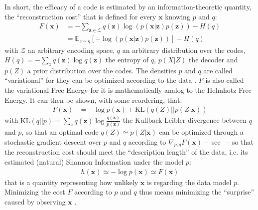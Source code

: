 \documentclass[12pt,twoside,openright]{article}
\begin{document}
In short, the efficacy of a code is estimated by an information-theoretic quantity, the ``reconstruction cost'' that is defined for every $\boldsymbol{x}$ knowing $p$ and $q$:
\begin{align}
F(\boldsymbol{x}) &= - \sum_{\boldsymbol{z} \in \mathcal{Z}} q(\boldsymbol{z}) \log (p(\boldsymbol{x}|\boldsymbol{z})p(\boldsymbol{z})) - H(q)\nonumber\\
&= \mathbb{E}_{z\sim q} \left[-\log (p(\boldsymbol{x}|\boldsymbol{z})p(\boldsymbol{z}))\right] - H(q)
\label{eq:FEP-energy}
\end{align}
with $\mathcal{Z}$ an arbitrary encoding space, $q$ an arbitrary distribution over the codes, $H(q) = -\sum_z q(\boldsymbol{z}) \log q(\boldsymbol{z})$ the entropy of $q$, $p(X|Z)$ the decoder and $p(Z)$ a prior distribution over the codes.
The densities $p$ and $q$ are called ``variational'' for they can be optimized according to the data \cite{hinton2006fast,kingma2013auto}.  
$F$ is also called the variational Free Energy for it is mathematically analog to the Helmhotz Free Energy.
It can then be shown, with some reordering, that:
\begin{align}
F(\boldsymbol{x}) 
&= - \log p(\boldsymbol{x}) + \text{KL}(q(Z)||p(Z|\boldsymbol{x}))
\label{eq:FEP}
\end{align}
with $\text{KL}(q||p) = \sum_z q(\boldsymbol{z}) \log \frac{q(\boldsymbol{z})}{p(\boldsymbol{z})}$ the Kullback-Leibler divergence between $q$ and $p$, so that an optimal code $q(Z)\simeq p(Z|\boldsymbol{x})$ can be optimized through a stochastic gradient descent over $p$ and $q$ according to $\nabla_{p,q} F(\boldsymbol{x}) $	 --~see \cite{kingma2013auto}~-- so that the reconstruction cost should meet the ``description length'' of the data, i.e. its estimated (natural) Shannon Information under the model $p$:
\begin{align*}
h(\boldsymbol{x}) \simeq -\log p(\boldsymbol{x}) \simeq  F(\boldsymbol{x})%
\end{align*}
that is a quantity representing how unlikely $\boldsymbol{x}$ is regarding the data model $p$. Minimizing the cost $F$ according to $p$ and $q$ thus means minimizing the ``surprise'' caused by observing $\boldsymbol{x}$ \cite{friston2010free}.
 
 
 
\end{document}
